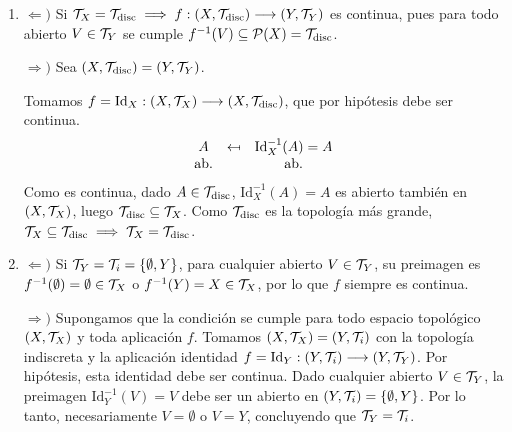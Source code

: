 \begin{dem}\begin{enumerate}
    \item $\Leftarrow)$ Si $\mathcal{T}_X = \mathcal{T}_{\text{disc}} \implies f: (X, \mathcal{T}_{\text{disc}}) \longrightarrow (Y, \mathcal{T}_Y)$ es continua, pues para todo abierto $V \in \mathcal{T}_Y$ se cumple $f^{-1}(V) \subseteq \mathcal{P}(X) = \mathcal{T}_{\text{disc}}$.
        
    $\Rightarrow)$ Sea $(X, \mathcal{T}_{\text{disc}}) = (Y, \mathcal{T}_Y)$.
        
        Tomamos $f = \text{Id}_X: (X, \mathcal{T}_X) \longrightarrow (X, \mathcal{T}_{\text{disc}})$, que por hipótesis debe ser continua.
        \[
            \begin{array}{ccc}
            A & \reflectbox{$\mapsto$} & \text{Id}_X^{-1}(A) = A \\
            \text{ab.} & & \text{ab.}
            \end{array}
        \]
        Como es continua, dado $A \in \mathcal{T}_{\text{disc}}$, $\text{Id}_X^{-1}(A) = A$ es abierto también en $(X, \mathcal{T}_X)$, luego $\mathcal{T}_{\text{disc}} \subseteq \mathcal{T}_X$. Como $\mathcal{T}_{\text{disc}}$ es la topología más grande, $\mathcal{T}_X \subseteq \mathcal{T}_{\text{disc}} \implies \mathcal{T}_X = \mathcal{T}_{\text{disc}}$.
    \item $\Leftarrow)$ Si $\mathcal{T}_Y = \mathcal{T}_i = \{\emptyset, Y\}$, para cualquier abierto $V \in \mathcal{T}_Y$, su preimagen es $f^{-1}(\emptyset) = \emptyset \in \mathcal{T}_X$ o $f^{-1}(Y) = X \in \mathcal{T}_X$, por lo que $f$ siempre es continua.

        $\Rightarrow)$  Supongamos que la condición se cumple para todo espacio topológico $(X, \mathcal{T}_X)$ y toda aplicación $f$. Tomamos $(X, \mathcal{T}_X) = (Y, \mathcal{T}_i)$ con la topología indiscreta y la aplicación identidad $f = \text{Id}_Y: (Y, \mathcal{T}_i) \longrightarrow (Y, \mathcal{T}_Y)$. Por hipótesis, esta identidad debe ser continua. Dado cualquier abierto $V \in \mathcal{T}_Y$, la preimagen $\text{Id}_Y^{-1}(V) = V$ debe ser un abierto en $(Y, \mathcal{T}_i) = \{\emptyset, Y\}$. Por lo tanto, necesariamente $V = \emptyset$ o $V = Y$, concluyendo que $\mathcal{T}_Y = \mathcal{T}_i$.
\end{enumerate}
\end{dem}

